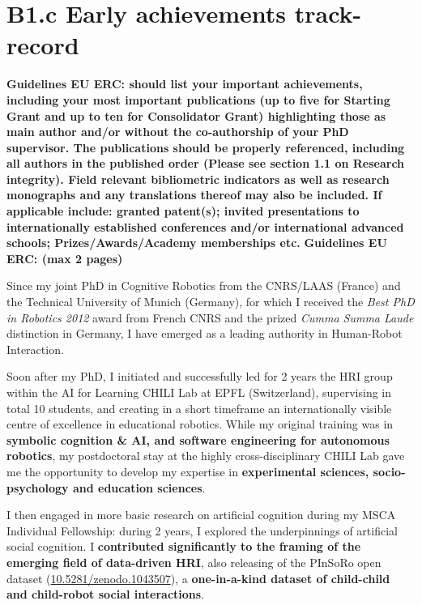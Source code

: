 \documentclass[11pt]{report}
\newcommand{\eu}[1]{{\color{teal}\textbf{Guidelines EU ERC: #1}}}
\begin{document}
\newpage
\chapter{B1.c Early achievements track-record}\label{early-achievements-track-record}

\eu{should list your important achievements,
including your most important publications (up to five for Starting Grant and up to ten for
Consolidator Grant) highlighting those as main author and/or without the co-authorship of your PhD
supervisor. The publications should be properly referenced, including all authors in the published
order (Please see section 1.1 on Research integrity). Field relevant bibliometric indicators as well as
research monographs and any translations thereof may also be included. If applicable include:
granted patent(s); invited presentations to internationally established conferences and/or
international advanced schools; Prizes/Awards/Academy memberships etc.}
\eu{(max 2 pages)}

Since my joint PhD in Cognitive Robotics from the CNRS/LAAS (France) and the
Technical University of Munich (Germany), for which I received the \emph{Best
PhD in Robotics 2012} award from French CNRS and the prized \emph{Cumma Summa
Laude} distinction in Germany, I have emerged as a leading authority in
Human-Robot Interaction.

Soon after my PhD, I initiated and successfully led for 2 years the HRI group
within the AI for Learning CHILI Lab at EPFL (Switzerland), supervising in total
10 students, and creating in a short timeframe an internationally visible centre
of excellence in educational robotics. While my original training was in
\textbf{symbolic cognition \& AI, and software engineering for autonomous
robotics}, my postdoctoral stay at the highly cross-disciplinary CHILI Lab gave
me the opportunity to develop my expertise in \textbf{experimental sciences,
socio-psychology and education sciences}.

I then engaged in more basic research on artificial cognition during my MSCA
Individual Fellowship: during 2 years, I explored the underpinnings of
artificial social cognition. I \textbf{contributed significantly to the framing
of the emerging field of data-driven HRI}, also releasing of the PInSoRo open
dataset (\href{https://doi.org/10.5281/zenodo.1043507}{10.5281/zenodo.1043507}),
a \textbf{one-in-a-kind dataset of child-child and child-robot social
interactions}.
\end{document}
